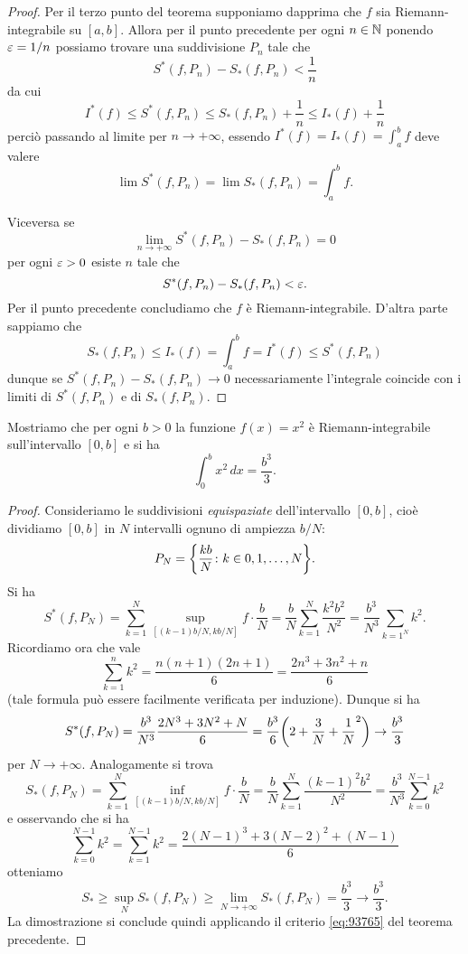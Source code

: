 \begin{proof}
Per il terzo punto del teorema
supponiamo dapprima che $f$ sia Riemann-integrabile su $[a,b]$.
Allora per il punto precedente per ogni $n\in \mathbb N$ ponendo $\varepsilon=1/n$ possiamo trovare una suddivisione $P_n$ tale che
\[
  S^*(f,P_n) - S_*(f,P_n) < \frac 1 n
\]
da cui
\[
  I^*(f) \le S^*(f,P_n) \le S_*(f,P_n) + \frac 1 n
   \le I_*(f) + \frac 1 n
\]
perciò passando al limite per $n\to +\infty$,
essendo $I^*(f) = I_*(f) = \int_a^b f$ deve valere
\[
  \lim S^*(f,P_n) = \lim S_*(f,P_n) = \int_a^b f.
\]

Viceversa se
\[
 \lim_{n\to +\infty} S^*(f,P_n) - S_*(f,P_n) = 0
\]
per ogni $\varepsilon>0$ esiste $n$ tale che
\[
  S^*(f,P_n) - S_*(f,P_n) < \varepsilon.
\]
Per il punto precedente concludiamo che $f$ è Riemann-integrabile.
D'altra parte sappiamo che
\[
  S_*(f,P_n) \le I_*(f) = \int_a^b f = I^*(f) \le S^*(f,P_n)
\]
dunque se $S^*(f,P_n) - S_*(f,P_n) \to 0$ necessariamente
l'integrale coincide con i limiti di $S^*(f,P_n)$ e di
$S_*(f,P_n)$.
\end{proof}

\begin{example}
\label{ex:integrale_quadrato}
Mostriamo che per ogni $b>0$ la funzione $f(x)=x^2$ è Riemann-integrabile sull'intervallo $[0,b]$ e si ha
\[
 \int_0^b x^2\, dx = \frac{b^3}{3}.
\]
\end{example}
\begin{proof}
Consideriamo le suddivisioni \emph{equispaziate} dell'intervallo $[0,b]$, cioè dividiamo $[0,b]$ in $N$ intervalli ognuno di ampiezza $b/N$:
\[
P_N = {\left\{ \frac{kb}{N}\colon k \in 0, 1, \dots, N \right\}}.
\]
Si ha
\[
  S^*(f,P_N) = \sum_{k=1}^N \sup_{[(k-1)b/N,kb/N]}f \cdot \frac b N
   = \frac{b}{N} \sum_{k=1}^N \frac{k^2b^2}{N^2}
   = \frac{b^3}{N^3} \sum_{k=1^N} k^2.
\]
Ricordiamo ora che vale
\[
  \sum_{k=1}^n k^2 = \frac{n(n+1)(2n+1)}{6} = \frac{2n^3+3n^2+n}{6}
\]
(tale formula può essere facilmente verificata per induzione). Dunque si ha
\[
  S^*(f,P_N) = \frac{b^3}{N^3} \frac{2N^3+3N^2+N}{6}
       = \frac{b^3}{6}{\left( 2 + \frac{3}{N}+\frac 1 N^2 \right)}
       \to \frac{b^3}{3}
\]
per $N\to +\infty$.
Analogamente si trova
\[
  S_*(f,P_N) = \sum_{k=1}^N \inf_{[(k-1)b/N,kb/N]} f \cdot \frac{b}{N}
  = \frac{b}{N}\sum_{k=1}^N \frac{(k-1)^2b^2}{N^2}
  = \frac{b^3}{N^3} \sum_{k=0}^{N-1} k^2
\]
e osservando che si ha
\[
 \sum_{k=0}^{N-1} k^2 = \sum_{k=1}^{N-1} k^2 = \frac{2(N-1)^3+3(N-2)^2+(N-1)}{6}
\]
otteniamo
\[
 S_*\ge \sup_N S_*(f,P_N) \ge \lim_{N\to+\infty} S_*(f,P_N) = \frac{b^3}{3} \to \frac{b^3}{3}.
\]
La dimostrazione si conclude quindi applicando
il criterio \eqref{eq:93765} del teorema precedente.
\end{proof}

